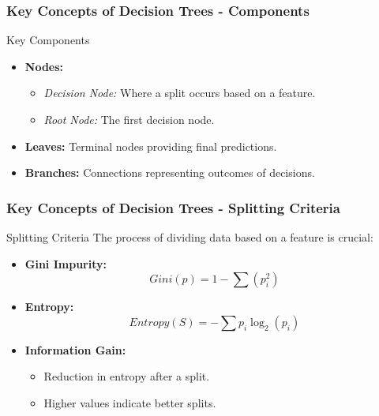 \documentclass[aspectratio=169]{beamer}
\begin{document}
\begin{frame}[fragile]
    \frametitle{Key Concepts of Decision Trees - Components}
    \begin{block}{Key Components}
        \begin{itemize}
            \item \textbf{Nodes:}
            \begin{itemize}
                \item \textit{Decision Node:} Where a split occurs based on a feature.
                \item \textit{Root Node:} The first decision node.
            \end{itemize}
            \item \textbf{Leaves:} Terminal nodes providing final predictions.
            \item \textbf{Branches:} Connections representing outcomes of decisions.
        \end{itemize}
    \end{block}
\end{frame}

\begin{frame}[fragile]
    \frametitle{Key Concepts of Decision Trees - Splitting Criteria}
    \begin{block}{Splitting Criteria}
        The process of dividing data based on a feature is crucial:
        \begin{itemize}
            \item \textbf{Gini Impurity:}
            \[
            Gini(p) = 1 - \sum (p_i^2)
            \]
            \item \textbf{Entropy:}
            \[
            Entropy(S) = -\sum p_i \log_2(p_i)
            \]
            \item \textbf{Information Gain:}
            \begin{itemize}
                \item Reduction in entropy after a split.
                \item Higher values indicate better splits.
            \end{itemize}
        \end{itemize}
    \end{block}
\end{frame}
\end{document}
